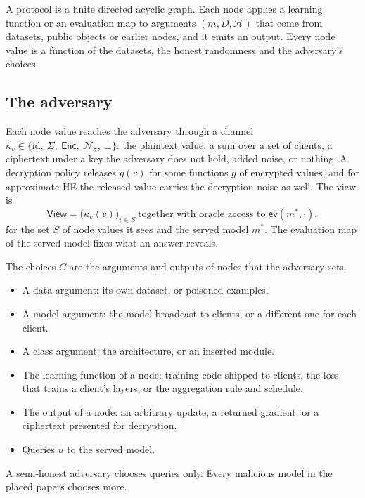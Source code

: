 \documentclass{labreport}
\newcommand{\Hc}{\mathcal{H}}
\newcommand{\Enc}{\mathsf{Enc}}
\newcommand{\View}{\mathsf{View}}
\begin{document}
A protocol is a finite directed acyclic graph. Each node applies a learning
function or an evaluation map to arguments $(m, D, \Hc)$ that come from
datasets, public objects or earlier nodes, and it emits an output. Every node
value is a function of the datasets, the honest randomness and the adversary's
choices.

\subsection*{The adversary}
Each node value reaches the adversary through a channel
$\kappa_v \in \{\mathrm{id},\ \Sigma,\ \Enc,\ \mathcal{N}_\sigma,\ \bot\}$: the
plaintext value, a sum over a set of clients, a ciphertext under a key the
adversary does not hold, added noise, or nothing. A decryption policy releases
$g(v)$ for some functions $g$ of encrypted values, and for approximate HE the
released value carries the decryption noise as well. The view is
\[
\View = \bigl(\kappa_v(v)\bigr)_{v\in S}\ \text{together with oracle access to } \mathsf{ev}(m^{*}, \cdot),
\]
for the set $S$ of node values it sees and the served model $m^{*}$. The
evaluation map of the served model fixes what an answer reveals.

The choices $C$ are the arguments and outputs of nodes that the adversary sets.
\begin{itemize}
\item A data argument: its own dataset, or poisoned examples.
\item A model argument: the model broadcast to clients, or a different one for
  each client.
\item A class argument: the architecture, or an inserted module.
\item The learning function of a node: training code shipped to clients, the
  loss that trains a client's layers, or the aggregation rule and schedule.
\item The output of a node: an arbitrary update, a returned gradient, or a
  ciphertext presented for decryption.
\item Queries $u$ to the served model.
\end{itemize}
A semi-honest adversary chooses queries only. Every malicious model in the
placed papers chooses more.
\end{document}
